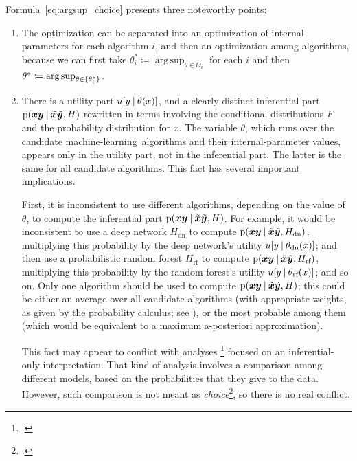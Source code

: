 \documentclass[\ifafour a4paper,12pt,\else a5paper,10pt,\fi%
onecolumn,oneside,article,%
british%
]{memoir}
\theoremstyle{remark}
\theoremstyle{innote}
\newcommand*{\citep}{\footcites}
\newcommand*{\defd}{\coloneqq}
\DeclarePairedDelimiter\set{\{}{\}} %
\newcommand*{\p}{\mathrm{p}}%
\renewcommand*{\|}[1][]{\nonscript\:#1\vert\nonscript\:\mathopen{}}
\newcommand*{\sect}{\S}%
\newcommand*{\chap}{ch.}%
\DeclareMathOperator*{\argsup}{arg\,sup}
\newcommand*{\ml}{machine-learning}
\newcommand*{\bz}{\bm{xy}}
\newcommand*{\bzz}{\tilde{\bm{x}}\tilde{\bm{y}}}
\newcommand*{\ctheta}{\theta^{*}}
\begin{document}
Formula~\eqref{eq:argsup_choice} presents three noteworthy points:
\begin{enumerate}[label=\textbf{(\Alph*)}, wide]
\item\label{item:nested_optim} The optimization can be separated into an
  optimization of internal parameters for each algorithm $i$, and then an
  optimization among algorithms, because we can first take
  $\ctheta_{i} \defd \argsup_{\theta \in \varTheta_{i}}$ for each $i$
  and then $\ctheta \defd \argsup_{\theta \in \set{\ctheta_{i}}}$.
  
\item\label{item:utility_vs_inference} There is a utility part
  $u[y \| \theta(x)]$, and a clearly distinct inferential part
  $\p(\bz\|\bzz,H)$ rewritten in terms involving the conditional
  distributions $F$ and the probability distribution for $x$. The variable
  $\theta$, which runs over the candidate \ml\ algorithms and their
  internal-parameter values, appears only in the utility part, not in the
  inferential part. The latter is the same for all candidate algorithms.
  This fact has several important implications.

  First, it is inconsistent to use different algorithms, depending on the
  value of $\theta$, to compute the inferential part $\p(\bz\|\bzz,H)$. For
  example, it would be inconsistent to use a deep network $H_{\text{dn}}$
  to compute $\p(\bz\|\bzz,H_{\text{dn}})$, multiplying this probability by
  the deep network's utility $u[y \| \theta_{\text{dn}}(x)]$; and then use
  a probabilistic random forest $H_{\text{rf}}$ to compute
  $\p(\bz\|\bzz,H_{\text{rf}})$, multiplying this probability by the random
  forest's utility $u[y \| \theta_{\text{rf}}(x)]$; and so on. Only one
  algorithm should be used to compute $\p(\bz\|\bzz,H)$; this could be
  either an average over all candidate algorithms (with appropriate
  weights, as given by the probability calculus; see \cite[\sect~28.1
  p.~347]{mackay1995_r2005}), or the most probable among them (which would
  be equivalent to a maximum a-posteriori approximation).

  This fact may appear to conflict with analyses \citep[for
  example][\sect~5]{mackay1992}[\sect~2.2]{mackay1992b}[\sect~1.3]{bishop2006}[\chap~12]{barber2007_r2020}[\sect~1.4.8]{murphy2012}
  focused on an inferential-only interpretation. That kind of analysis
  involves a comparison among different models, based on the probabilities
  that they give to the data. However, such comparison is not meant as
  \emph{choice}\citep[\enquote{This paper concerns inference alone and no
    loss functions or utilities are
    involved}][footnote~1]{mackay1992}[\enquote{When we discuss model
    comparison, this should not be construed as implying model
    \emph{choice}}][\sect~28.1 p.~347]{mackay1995_r2005}, so there is no
  real conflict.



\end{enumerate}
\end{document}
